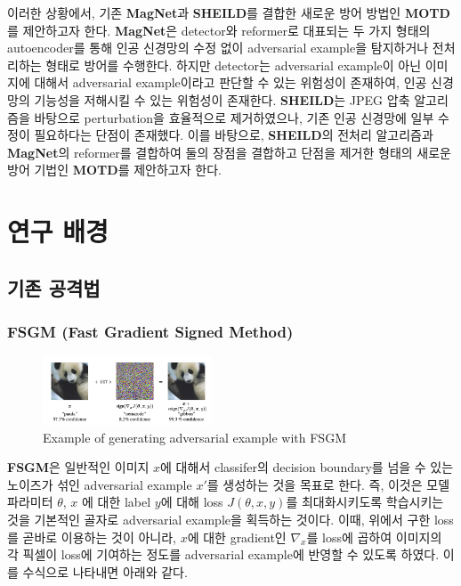 \documentclass{article}
\begin{document}
이러한 상황에서, 기존 \textbf{MagNet}과 \textbf{SHEILD}를 결합한 새로운 방어 방법인 \textbf{MOTD}를 제안하고자 한다. \textbf{MagNet}은 detector와 reformer로 대표되는 두 가지 형태의 autoencoder를 통해 인공 신경망의 수정 없이 adversarial example을 탐지하거나 전처리하는 형태로 방어를 수행한다. 하지만 detector는 adversarial example이 아닌 이미지에 대해서 adversarial example이라고 판단할 수 있는 위험성이 존재하여, 인공 신경망의 기능성을 저해시킬 수 있는 위험성이 존재한다. \textbf{SHEILD}는 JPEG 압축 알고리즘을 바탕으로 perturbation을 효율적으로 제거하였으나, 기존 인공 신경망에 일부 수정이 필요하다는 단점이 존재했다. 이를 바탕으로, \textbf{SHEILD}의 전처리 알고리즘과 \textbf{MagNet}의 reformer를 결합하여 둘의 장점을 결합하고 단점을 제거한 형태의 새로운 방어 기법인 \textbf{MOTD}를 제안하고자 한다.

 
\section{연구 배경}

\subsection{기존 공격법}


\subsubsection{FSGM (Fast Gradient Signed Method)}

\begin{figure}
    \centering
    \includegraphics[width=0.45\textwidth]{images/adversarial-example.png}
    \caption{Example of generating adversarial example with FSGM \cite{goodfellow2014explaining}}
\end{figure}

\textbf{FSGM}은 일반적인 이미지 $x$에 대해서 classifer의 decision boundary를 넘을 수 있는 노이즈가 섞인 adversarial example $x'$를 생성하는 것을 목표로 한다. 즉, 이것은 모델 파라미터 $\theta$, $x$ 에 대한 label $y$에 대해 loss $J(\theta, x, y)$를 최대화시키도록 학습시키는 것을 기본적인 골자로 adversarial example을 획득하는 것이다. 이때, 위에서 구한 loss를 곧바로 이용하는 것이 아니라, $x$에 대한 gradient인 $\nabla_x$를 loss에 곱하여 이미지의 각 픽셀이 loss에 기여하는 정도를 adversarial example에 반영할 수 있도록 하였다. 이를 수식으로 나타내면 아래와 같다. \cite{goodfellow2014explaining}
\end{document}
